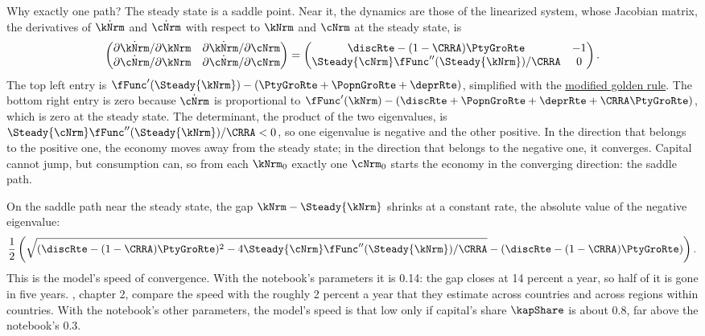 \documentclass{econark}
\begin{document}
Why exactly one path? The steady state is a saddle point. Near it, the dynamics are those of the linearized system, whose Jacobian matrix, the derivatives of $\dot{\kNrm}$ and $\dot{\cNrm}$ with respect to $\kNrm$ and $\cNrm$ at the steady state, is
\begin{equation}
  \begin{pmatrix} \partial\dot{\kNrm}/\partial\kNrm & \partial\dot{\kNrm}/\partial\cNrm \\ \partial\dot{\cNrm}/\partial\kNrm & \partial\dot{\cNrm}/\partial\cNrm \end{pmatrix}
  = \begin{pmatrix} \discRte-(1-\CRRA)\PtyGroRte & -1 \\ \Steady{\cNrm}\fFunc^{\prime\prime}(\Steady{\kNrm})/\CRRA & 0 \end{pmatrix} . \label{eq:RCK-Jacobian}
\end{equation}
The top left entry is $\fFunc^{\prime}(\Steady{\kNrm})-(\PtyGroRte+\PopnGroRte+\deprRte)$, simplified with the \hyperref[eq:RCK-modGoldenRule]{modified golden rule}. The bottom right entry is zero because $\dot{\cNrm}$ is proportional to $\fFunc^{\prime}(\kNrm)-(\discRte+\PopnGroRte+\deprRte+\CRRA\PtyGroRte)$, which is zero at the steady state. The determinant, the product of the two eigenvalues, is $\Steady{\cNrm}\fFunc^{\prime\prime}(\Steady{\kNrm})/\CRRA<0$, so one eigenvalue is negative and the other positive. In the direction that belongs to the positive one, the economy moves away from the steady state; in the direction that belongs to the negative one, it converges. Capital cannot jump, but consumption can, so from each $\kNrm_{0}$ exactly one $\cNrm_{0}$ starts the economy in the converging direction: the saddle path.

On the saddle path near the steady state, the gap $\kNrm-\Steady{\kNrm}$ shrinks at a constant rate, the absolute value of the negative eigenvalue:
\begin{equation}
  \frac{1}{2}\left(\sqrt{(\discRte-(1-\CRRA)\PtyGroRte)^{2}-4\Steady{\cNrm}\fFunc^{\prime\prime}(\Steady{\kNrm})/\CRRA}-(\discRte-(1-\CRRA)\PtyGroRte)\right) . \label{eq:RCK-convergenceSpeed}
\end{equation}
This is the model's speed of convergence. With the notebook's parameters it is 0.14: the gap closes at 14 percent a year, so half of it is gone in five years. \citet{barro&salaimartin:book}, chapter 2, compare the speed with the roughly 2 percent a year that they estimate across countries and across regions within countries. With the notebook's other parameters, the model's speed is that low only if capital's share $\kapShare$ is about 0.8, far above the notebook's 0.3.
\end{document}
